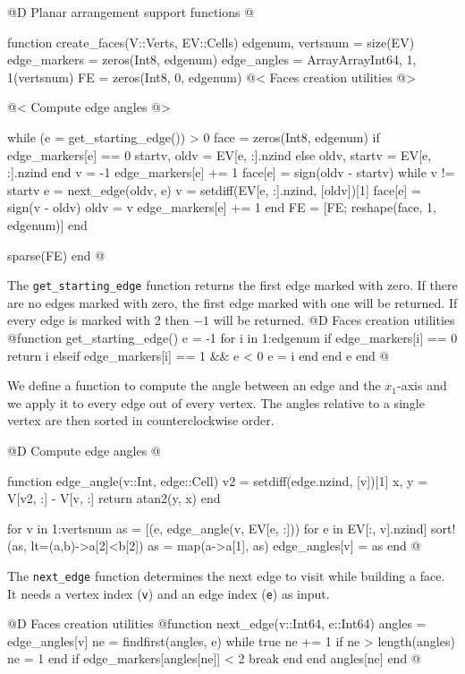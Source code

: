 \documentclass[10pt]{book}
\begin{document}
@D Planar arrangement support functions
@{function create_faces(V::Verts, EV::Cells)
    edgenum, vertsnum = size(EV)
    edge_markers = zeros(Int8, edgenum)
    edge_angles = Array{Array{Int64, 1}, 1}(vertsnum)
    FE = zeros(Int8, 0, edgenum)
    @< Faces creation utilities @>

    @< Compute edge angles @>

    while (e = get_starting_edge()) > 0
        face = zeros(Int8, edgenum)
        if edge_markers[e] == 0
            startv, oldv = EV[e, :].nzind
        else
            oldv, startv = EV[e, :].nzind
        end
        v = -1
        edge_markers[e] += 1
        face[e] = sign(oldv - startv)
        while v != startv
            e = next_edge(oldv, e)
            v = setdiff(EV[e, :].nzind, [oldv])[1]
            face[e] = sign(v - oldv)
            oldv = v
            edge_markers[e] += 1
        end
        FE = [FE; reshape(face, 1, edgenum)]
    end

    sparse(FE)
end
@}
The \texttt{get\_starting\_edge} function returns the first edge
marked with zero. If there are no edges marked with zero, the first edge
marked with one will be returned. If every edge is marked with 2 then $-1$
will be returned.
@D Faces creation utilities
@{function get_starting_edge()
    e = -1
    for i in 1:edgenum
        if edge_markers[i] == 0
            return i
        elseif edge_markers[i] == 1 && e < 0
            e = i
        end
    end
    e
end
@}

We define a function to compute the angle between an edge and the 
$x_1$-axis and we apply it to every edge out of every vertex.
The angles relative to a single vertex are then sorted in counterclockwise order.

@D Compute edge angles
@{function edge_angle(v::Int, edge::Cell)
    v2 = setdiff(edge.nzind, [v])[1]
    x, y = V[v2, :] - V[v, :]
    return atan2(y, x)
end

for v in 1:vertsnum
    as = [(e, edge_angle(v, EV[e, :])) for e in EV[:, v].nzind]
    sort!(as, lt=(a,b)->a[2]<b[2])
    as = map(a->a[1], as)
    edge_angles[v] = as
end
@}

The \texttt{next\_edge} function determines the next edge to visit
while building a face. It needs a vertex index (\texttt{v}) and 
an edge index (\texttt{e}) as input.

@D Faces creation utilities
@{function next_edge(v::Int64, e::Int64)
    angles = edge_angles[v]
    ne = findfirst(angles, e)
    while true
        ne += 1
        if ne > length(angles)
            ne = 1
        end
        if edge_markers[angles[ne]] < 2
            break
        end
    end
    angles[ne]
end
@}
\end{document}
